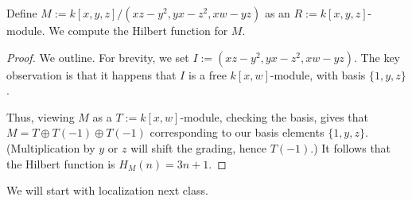 \begin{exe}[Eisenbud 1.19]
	Define $M:=k[x,y,z]/\left(xz-y^2,yx-z^2,xw-yz\right)$ as an $R:=k[x,y,z]$-module. We compute the Hilbert function for $M$.
\end{exe}
\begin{proof}
	We outline. For brevity, we set $I:=\left(xz-y^2,yx-z^2,xw-yz\right)$. The key observation is that it happens that $I$ is a free $k[x,w]$-module, with basis $\{1,y,z\}$.

	Thus, viewing $M$ as a $T:=k[x,w]$-module, checking the basis, gives that $M=T\oplus T(-1)\oplus T(-1)$ corresponding to our basis elements $\{1,y,z\}$. (Multiplication by $y$ or $z$ will shift the grading, hence $T(-1)$.) It follows that the Hilbert function is $H_M(n)=3n+1$.
\end{proof}
We will start with localization next class.
